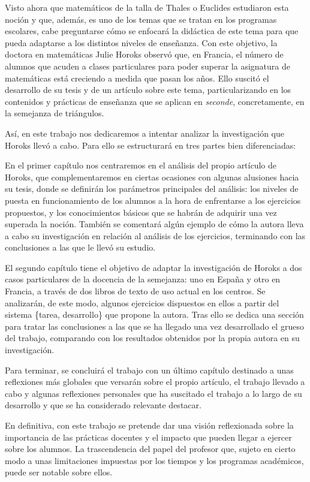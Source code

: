 	Visto ahora que matemáticos de la talla de Thales o Euclides estudiaron esta noción y que, además, es uno de los temas que se tratan en los programas escolares, cabe preguntarse cómo se enfocará la didáctica de este tema para que pueda adaptarse a los distintos niveles de enseñanza. Con este objetivo, la doctora en matemáticas Julie Horoks observó que, en Francia, el número de alumnos que acuden a clases particulares para poder superar la asignatura de matemáticas está creciendo a medida que pasan los años. Ello suscitó el desarrollo de su tesis y de un artículo sobre este tema, particularizando en los contenidos y prácticas de enseñanza que se aplican en \textit{seconde}, concretamente, en la semejanza de triángulos.
	
	Así, en este trabajo nos dedicaremos a intentar analizar la investigación que Horoks llevó a cabo. Para ello se estructurará en tres partes bien diferenciadas:
	
	En el primer capítulo nos centraremos en el análisis del propio artículo de Horoks, que complementaremos en ciertas ocasiones con algunas alusiones hacia su tesis, donde se definirán los parámetros principales del análisis: los niveles de puesta en funcionamiento de los alumnos a la hora de enfrentarse a los ejercicios propuestos, y los conocimientos básicos que se habrán de adquirir una vez superada la noción. También se comentará algún ejemplo de cómo la autora lleva a cabo su investigación en relación al análisis de los ejercicios, terminando con las conclusiones a las que le llevó su estudio.
	
	El segundo capítulo tiene el objetivo de adaptar la investigación de Horoks a dos casos particulares de la docencia de la semejanza: uno en España y otro en Francia, a través de dos libros de texto de uso actual en los centros. Se analizarán, de este modo, algunos ejercicios dispuestos en ellos a partir del sistema \{tarea, desarrollo\} que propone la autora. Tras ello se dedica una sección para tratar las conclusiones a las que se ha llegado una vez desarrollado el grueso del trabajo, comparando con los resultados obtenidos por la propia autora en su investigación.
	
	Para terminar, se concluirá el trabajo con un último capítulo destinado a unas reflexiones más globales que versarán sobre el propio artículo, el trabajo llevado a cabo y algunas reflexiones personales que ha suscitado el trabajo a lo largo de su desarrollo y que se ha considerado relevante destacar.
	
	En definitiva, con este trabajo se pretende dar una visión reflexionada sobre la importancia de las prácticas docentes y el impacto que pueden llegar a ejercer sobre los alumnos. La trascendencia del papel del profesor que, sujeto en cierto modo a unas limitaciones impuestas por los tiempos y los programas académicos, puede ser notable sobre ellos.
	
	
	
	
	
	
	
	